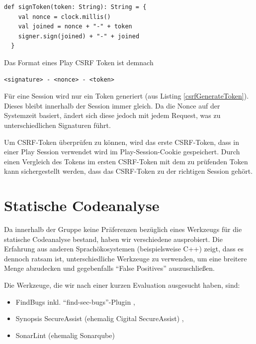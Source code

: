 \documentclass[12pt,DIV14,BCOR10mm,a4paper,parskip=half-,headsepline,headinclude,english,ngerman,bibliography=totocnumbered]{scrreprt}
\begin{document}
\begin{lstlisting}[label=csrfSignToken, caption={Methode zum Signieren von Token. Aus DefaultCSRFTokenSigner, Play 2.6.20},captionpos=b]
  def signToken(token: String): String = {
    val nonce = clock.millis()
    val joined = nonce + "-" + token
    signer.sign(joined) + "-" + joined
  }
\end{lstlisting}

Das Format eines Play CSRF Token ist demnach
\begin{lstlisting}
<signature> - <nonce> - <token>
\end{lstlisting}

Für eine Session wird nur ein Token generiert (aus Listing \ref{csrfGenerateToken}). Dieses bleibt innerhalb der Session immer gleich. Da die Nonce auf der Systemzeit basiert, ändert sich diese jedoch mit jedem Request, was zu unterschiedlichen Signaturen führt.

Um CSRF-Token überprüfen zu können, wird das erste CSRF-Token, dass in einer Play Session verwendet wird im Play-Session-Cookie gespeichert. Durch einen Vergleich des Tokens im ersten CSRF-Token mit dem zu prüfenden Token kann sichergestellt werden, dass das CSRF-Token zu der richtigen Session gehört.


\section{Statische Codeanalyse}

Da innerhalb der Gruppe keine Präferenzen bezüglich eines Werkzeugs für die statische Codeanalyse bestand, haben wir verschiedene ausprobiert.
Die Erfahrung aus anderen Sprachökosystemen (beispielsweise C++) zeigt, dass es dennoch ratsam ist, unterschiedliche Werkzeuge zu verwenden, um eine breitere Menge abzudecken und gegebenfalls \enquote{False Positives} auszuschließen.

Die Werkzeuge, die wir nach einer kurzen Evaluation ausgesucht haben, sind:

\begin{itemize}
  \item FindBugs \autocite{FindBugs} inkl. \enquote{find-sec-bugs}-Plugin \autocite{FindBugs.FindSecBugs},
  \item Synopsis SecureAssist (ehemalig Cigital SecureAssist) \autocite{SecureAssist},
  \item SonarLint (ehemalig Sonarqube) \autocite{SonarLint}
\end{itemize}
\end{document}
